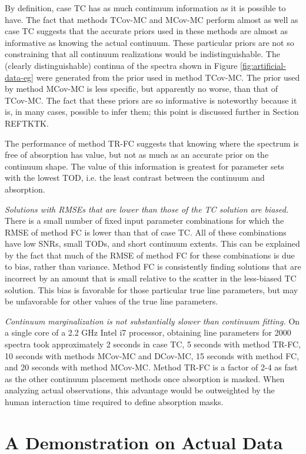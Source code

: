 \documentclass[trackchanges]{aastex62}
\begin{document}
{By definition, case TC has as much continuum information as it is possible to have.
The fact that methods TCov-MC and MCov-MC perform almost as well as case TC suggests that the accurate priors used in these methods are almost as informative as knowing the actual continuum.
These particular priors are not so constraining that all continuum realizations would be indistinguishable.
The (clearly distinguishable) continua of the spectra shown in Figure \ref{fig:artificial-data-eg} were generated from the prior used in method TCov-MC.
The prior used by method MCov-MC is less specific, but apparently no worse, than that of TCov-MC.
The fact that these priors are so informative is noteworthy because it is, in many cases, possible to infer them; this point is discussed further in Section REFTKTK.

The performance of method TR-FC suggests that knowing where the spectrum is free of absorption has value, but not as much as an accurate prior on the continuum shape.
The value of this information is greatest for parameter sets with the lowest TOD, i.e. the least contrast between the continuum and absorption.

\emph{Solutions with RMSEs that are lower than those of the TC solution are biased.}
There is a small number of fixed input parameter combinations for which the RMSE of method FC is lower than that of case TC.
All of these combinations have low SNRs, small TODs, and short continuum extents.
This can be explained by the fact that much of the RMSE of method FC for these combinations is due to bias, rather than variance.
Method FC is consistently finding solutions that are incorrect by an amount that is small relative to the scatter in the less-biased TC solution.
This bias is favorable for those particular true line parameters, but may be unfavorable for other values of the true line parameters.

\emph{Continuum marginalization is not substantially slower than continuum fitting.}
On a single core of a 2.2 GHz Intel i7 processor, obtaining line parameters for 2000 spectra took approximately 2 seconds in case TC, 5 seconds with method TR-FC, 10 seconds with methods MCov-MC and DCov-MC, 15 seconds with method FC, and 20 seconds with method MCov-MC.
Method TR-FC is a factor of 2-4 as fast as the other continuum placement methods once absorption is masked.
When analyzing actual observations, this advantage would be outweighted by the human interaction time required to define absorption masks.
}


\section{A Demonstration on Actual Data}
\end{document}
